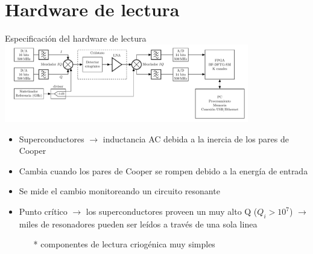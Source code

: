 \documentclass[ignorenonframetext,12pt]{beamer}
\begin{document}
\section{Hardware de lectura}
\begin{frame}{Especificación del hardware de lectura}
	\centering
	\qquad \includegraphics[width=0.8\textwidth]{c3_readout_general_mio}
	\begin{itemize}
		\item \footnotesize{Superconductores $\to$ inductancia AC debida a la
			inercia de los pares de Cooper}
		\item Cambia cuando los pares de Cooper se rompen debido a la
			energía de entrada
		\item Se mide el cambio monitoreando un circuito resonante
		\item Punto crítico $\to$ los \alert{superconductores proveen un muy
			alto Q} ($Q_i > 10^7$) $\to$ miles de resonadores
			pueden ser leídos a través de una sola linea 
			\begin{itemize}
				\item[*] \scriptsize{{\color{blue}componentes de lectura criogénica muy
					simples}}
			\end{itemize}
	\end{itemize}
\end{frame}
\end{document}
